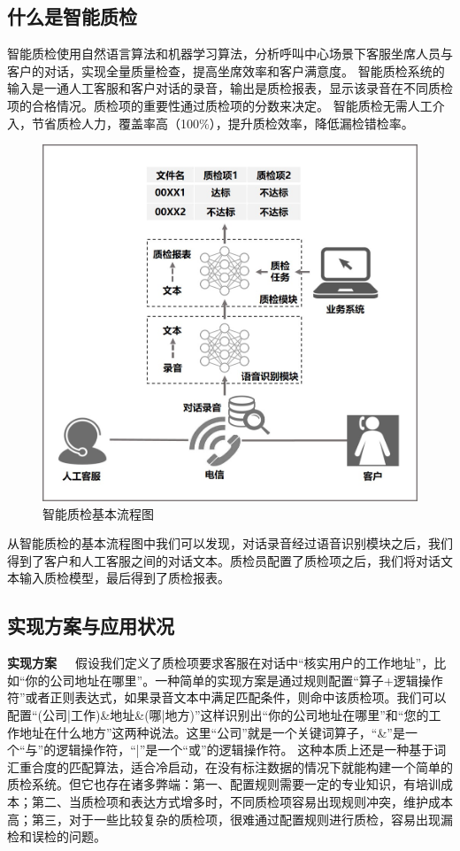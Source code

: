\subsection{什么是智能质检}

智能质检使用自然语言算法和机器学习算法，分析呼叫中心场景下客服坐席人员与客户的对话，实现全量质量检查，提高坐席效率和客户满意度。
智能质检系统的输入是一通人工客服和客户对话的录音，输出是质检报表，显示该录音在不同质检项的合格情况。质检项的重要性通过质检项的分数来决定。
智能质检无需人工介入，节省质检人力，覆盖率高（100\%），提升质检效率，降低漏检错检率。
\begin{figure}[h]
\centering
\includegraphics[scale=0.4]{./img/chapter4_b/qic_workflow.jpg}
\caption{智能质检基本流程图}
\label{fig1}
\end{figure}

从智能质检的基本流程图中我们可以发现，对话录音经过语音识别模块之后，我们得到了客户和人工客服之间的对话文本。质检员配置了质检项之后，我们将对话文本输入质检模型，最后得到了质检报表。
\subsection{实现方案与应用状况}
\textbf{实现方案}~~~假设我们定义了质检项要求客服在对话中“核实用户的工作地址”，比如“你的公司地址在哪里”。一种简单的实现方案是通过规则配置“算子+逻辑操作符”或者正则表达式，如果录音文本中满足匹配条件，则命中该质检项。我们可以配置“(公司|工作)\&地址\&(哪|地方)”这样识别出“你的公司地址在哪里”和“您的工作地址在什么地方”这两种说法。这里“公司”就是一个关键词算子，“\&”是一个“与”的逻辑操作符，“|”是一个“或”的逻辑操作符。
这种本质上还是一种基于词汇重合度的匹配算法，适合冷启动，在没有标注数据的情况下就能构建一个简单的质检系统。但它也存在诸多弊端：第一、配置规则需要一定的专业知识，有培训成本；第二、当质检项和表达方式增多时，不同质检项容易出现规则冲突，维护成本高；第三，对于一些比较复杂的质检项，很难通过配置规则进行质检，容易出现漏检和误检的问题。


